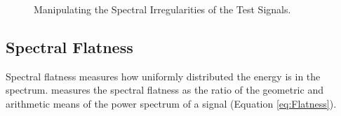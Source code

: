 		\begin{figure}[h!]
			\centering
			\qquad
			
			\caption{Manipulating the Spectral Irregularities of the Test Signals.}
			\label{fig:MoveIrregularities}
		\end{figure}

	\subsection{Spectral Flatness}
	\label{sec:FeatureControl-Parameterisation-Flatness}
		Spectral flatness measures how uniformly distributed the energy is in the spectrum.
		\citet{johnston1988transform} measures the spectral flatness as the ratio of the geometric and arithmetic
		means of the power spectrum of a signal (Equation \ref{eq:Flatness}).

